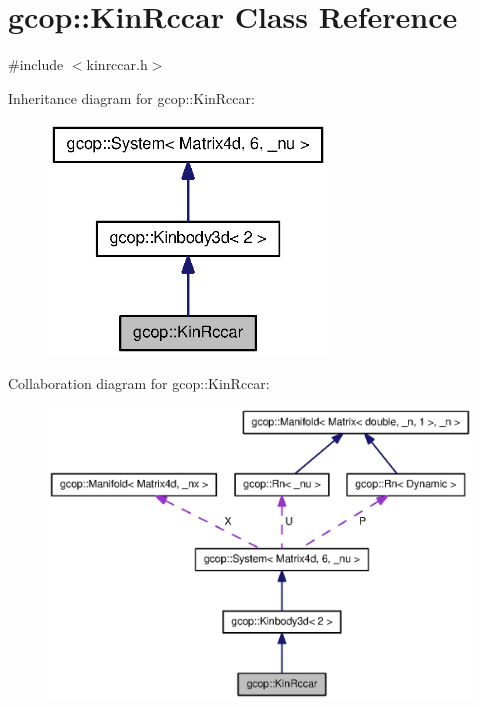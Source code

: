 \section{gcop\-:\-:\-Kin\-Rccar \-Class \-Reference}
\label{classgcop_1_1KinRccar}


{\ttfamily \#include $<$kinrccar.\-h$>$}



\-Inheritance diagram for gcop\-:\-:\-Kin\-Rccar\-:\nopagebreak
\begin{figure}[H]
\begin{center}
\leavevmode
\includegraphics[width=210pt]{classgcop_1_1KinRccar__inherit__graph}
\end{center}
\end{figure}


\-Collaboration diagram for gcop\-:\-:\-Kin\-Rccar\-:\nopagebreak
\begin{figure}[H]
\begin{center}
\leavevmode
\includegraphics[width=350pt]{classgcop_1_1KinRccar__coll__graph}
\end{center}
\end{figure}
